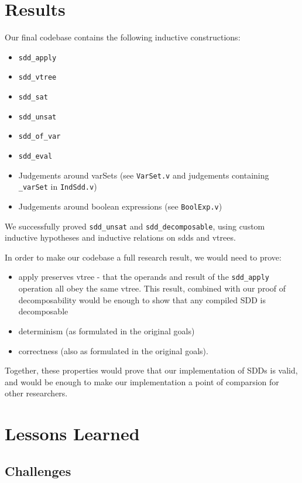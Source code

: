 \documentclass[twocolumn]{article}
\theoremstyle{definition}
\begin{document}
\section{Results}

Our final codebase contains the following inductive constructions:

\begin{itemize}
\item \texttt{sdd\_apply}
\item \texttt{sdd\_vtree}
\item \texttt{sdd\_sat}
\item \texttt{sdd\_unsat}
\item \texttt{sdd\_of\_var}
\item \texttt{sdd\_eval}
\item Judgements around varSets (see \texttt{VarSet.v} and judgements containing \texttt{\_varSet} in \texttt{IndSdd.v})
\item Judgements around boolean expressions (see \texttt{BoolExp.v})
\end{itemize}

We successfully proved \texttt{sdd\_unsat} and \texttt{sdd\_decomposable}, using custom inductive hypotheses and inductive relations on sdds and vtrees. 

In order to make our codebase a full research result, we would need to prove:

\begin{itemize}
\item apply preserves vtree - that the operands and result of the \texttt{sdd\_apply} operation all obey the same vtree. This result, combined with our proof of decomposability would be enough to show that any compiled SDD is decomposable
\item determinism (as formulated in the original goals)
\item correctness (also as formulated in the original goals).
\end{itemize}

Together, these properties would prove that our implementation of SDDs is valid, and would be enough to make our implementation a point of comparsion for other researchers.

\section{Lessons Learned}

\subsection{Challenges}
\end{document}
